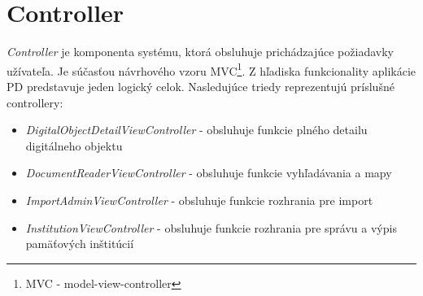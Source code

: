 \documentclass[
  print, %
  table,   %
  lof,     %
  nolot,     %
]{fithesis3}
\begin{document}
\section{Controller}
\textit{Controller} je komponenta systému, ktorá obsluhuje prichádzajúce požiadavky užívateľa. Je súčasťou návrhového vzoru MVC\footnote{MVC - model-view-controller}. Z hľadiska funkcionality aplikácie PD predstavuje jeden logický celok. Nasledujúce triedy reprezentujú príslušné controllery:
\begin{itemize}
	\item \textit{DigitalObjectDetailViewController} - obsluhuje funkcie plného detailu digitálneho objektu
	\item \textit{DocumentReaderViewController} - obsluhuje funkcie vyhľadávania a mapy
	\item \textit{ImportAdminViewController} - obsluhuje funkcie rozhrania pre import
	\item \textit{InstitutionViewController} - obsluhuje funkcie rozhrania pre správu a výpis pamäťových inštitúcií	
\end{itemize}
\end{document}
